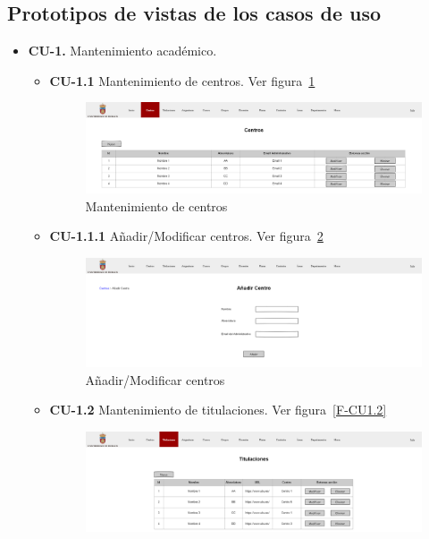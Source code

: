 \subsection{Prototipos de vistas de los casos de uso}
\begin{itemize}
	\item \textbf{CU-1.} Mantenimiento académico.
	\begin{itemize}
		\item \textbf{CU-1.1} Mantenimiento de centros. Ver figura~\ref{F-CU1.1}
		\begin{figure}[!h]
		\centering
		\includegraphics[width=\textwidth]{../img/Anexos/Vistas/centros.png}
		\caption{Mantenimiento de centros}\label{F-CU1.1}
		\end{figure}
		\FloatBarrier
		\item \textbf{CU-1.1.1} Añadir/Modificar centros. Ver figura~\ref{F-CU1.1.1}
		\begin{figure}[!h]
		\centering
		\includegraphics[width=\textwidth]{../img/Anexos/Vistas/add_centro.png}
		\caption{Añadir/Modificar centros}\label{F-CU1.1.1}
		\end{figure}
		\FloatBarrier
\newpage
		\item \textbf{CU-1.2} Mantenimiento de titulaciones. Ver figura~\ref{F-CU1.2}
		\begin{figure}[!h]
		\centering
		\includegraphics[width=\textwidth]{../img/Anexos/Vistas/titulaciones.png}

\end{figure}
\end{itemize}
\end{itemize}
